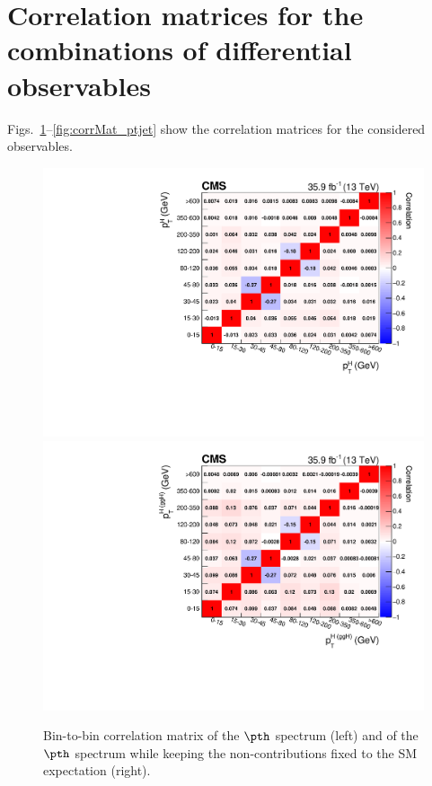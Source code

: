 \begin{table}[h!]
    \centering
    \label{tab:numbers_ptjet}
    \end{table}


\clearpage
\section{Correlation matrices for the combinations of differential observables}
\label{sec:binToBinCorrelationMatrices}

Figs.~\ref{fig:corrMat_pth}--\ref{fig:corrMat_ptjet} show the correlation matrices for the considered observables.

\begin{figure}[hbtp]
  \begin{center}
    \includegraphics[width=0.49\linewidth]{img/differentials/appendix/corrmat_pth_smH.pdf}
    \includegraphics[width=0.49\linewidth]{img/differentials/appendix/corrmat_pth_ggH.pdf}
    \caption{
         Bin-to-bin correlation matrix of the $\pth$ spectrum (left) and of the $\pth$ spectrum while keeping the non-\ggh contributions fixed to the SM expectation (right).
        }
    \label{fig:corrMat_pth}
  \end{center}
\end{figure}


